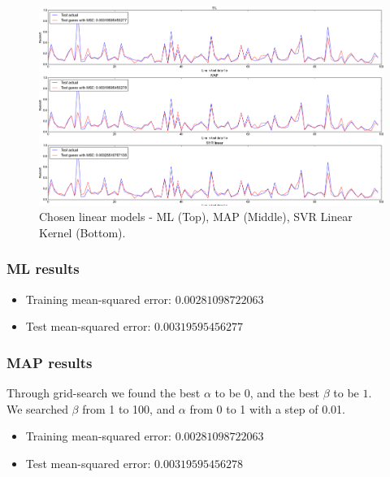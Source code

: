 \documentclass[12pt]{article}
\begin{document}
\begin{figure}[H]
	\includegraphics[scale=0.35]{linear_model.png}
	\caption{Chosen linear models - ML (Top), MAP (Middle), SVR Linear Kernel (Bottom).}
	\label{fig:linear_regression}
\end{figure}

\newpage

\subsubsection{ML results}

\begin{itemize}
	\item Training mean-squared error: $0.00281098722063$ 
	\item Test mean-squared error: $0.00319595456277$
\end{itemize}


\subsubsection{MAP results}

Through grid-search we found the best $\alpha$ to be $0$, and the best $\beta$ to be $1$. \\
We searched $\beta$ from 1 to 100, and $\alpha$ from 0 to 1 with a step of 0.01.

\begin{itemize}
	\item Training mean-squared error: $0.00281098722063$
	\item Test mean-squared error: $0.00319595456278$
\end{itemize}
\end{document}
